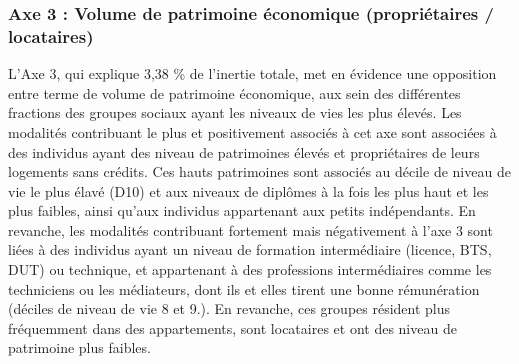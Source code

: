 \documentclass[
  12pt,
]{book}
\begin{document}
\subsubsection{Axe 3 : Volume de patrimoine économique (propriétaires /
locataires)}\label{axe-3-volume-de-patrimoine-uxe9conomique-propriuxe9taires-locataires}

L'Axe 3, qui explique 3,38 \% de l'inertie totale, met en évidence une
opposition entre terme de volume de patrimoine économique, aux sein des
différentes fractions des groupes sociaux ayant les niveaux de vies les
plus élevés. Les modalités contribuant le plus et positivement associés
à cet axe sont associées à des individus ayant des niveau de patrimoines
élevés et propriétaires de leurs logements sans crédits. Ces hauts
patrimoines sont associés au décile de niveau de vie le plus élavé (D10)
et aux niveaux de diplômes à la fois les plus haut et les plus faibles,
ainsi qu'aux individus appartenant aux petits indépendants. En revanche,
les modalités contribuant fortement mais négativement à l'axe 3 sont
liées à des individus ayant un niveau de formation intermédiaire
(licence, BTS, DUT) ou technique, et appartenant à des professions
intermédiaires comme les techniciens ou les médiateurs, dont ils et
elles tirent une bonne rémunération (déciles de niveau de vie 8 et 9.).
En revanche, ces groupes résident plus fréquemment dans des
appartements, sont locataires et ont des niveau de patrimoine plus
faibles.

\begingroup\fontsize{7}{9}\selectfont
\end{document}
